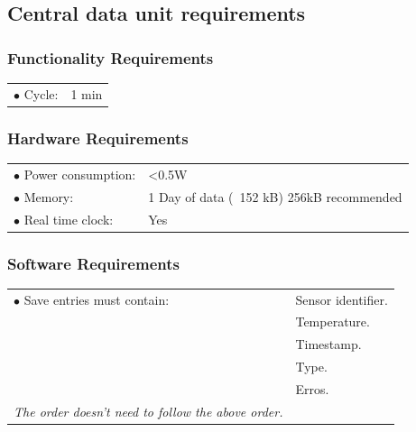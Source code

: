 \subsection{Central data unit requirements}

\subsubsection{Functionality Requirements}
\begin{table}[H]
\begin{tabular}{p{8cm} p{2cm}}
$\bullet$ Cycle\footnotemark: & 1 min\\
\end{tabular}
\end{table}
\subsubsection{Hardware Requirements}
\begin{table}[H]
\begin{tabular}{p{8cm} p{2cm}}
$\bullet$ Power consumption: & <0.5W \footnotemark \\
$\bullet$ Memory: & 1 Day of data (~152 kB) 256kB recommended\\
$\bullet$ Real time clock: & Yes\\
\end{tabular}
\end{table}


\subsubsection{Software Requirements}
\begin{table}[H]
\begin{tabular}{p{8cm} p{5cm}}
$\bullet$ Save entries must contain: &Sensor identifier. \\
~ 									&Temperature. \\
~									&Timestamp. \\
~									&Type. \\
~									&Erros. \\
\textit{The order doesn't need to follow the above order.}

\end{tabular}
\end{table}


